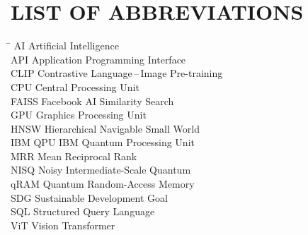 \chapter*{LIST OF ABBREVIATIONS}


\begin{tabbing}
\hspace{3.5cm}\=\kill
AI         \> Artificial Intelligence \\
API        \> Application Programming Interface \\
CLIP       \> Contrastive Language\,--\,Image Pre-training \\
CPU        \> Central Processing Unit \\
FAISS      \> Facebook AI Similarity Search \\
GPU        \> Graphics Processing Unit \\
HNSW       \> Hierarchical Navigable Small World \\
IBM QPU    \> IBM Quantum Processing Unit \\
MRR        \> Mean Reciprocal Rank \\
NISQ       \> Noisy Intermediate-Scale Quantum \\
qRAM       \> Quantum Random-Access Memory \\
SDG        \> Sustainable Development Goal \\
SQL        \> Structured Query Language \\
ViT        \> Vision Transformer \\
\end{tabbing}

\clearpage
